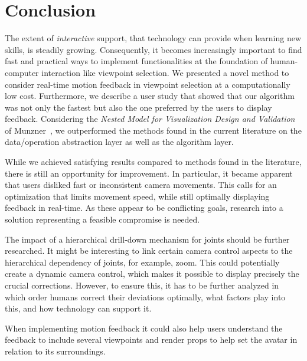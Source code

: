 \section{Conclusion}
The extent of \emph{interactive} support, that technology can provide when learning new skills, is steadily growing. Consequently, it becomes increasingly important to find fast and practical ways to implement functionalities at the foundation of human-computer interaction like viewpoint selection. We presented a novel method to consider real-time motion feedback in viewpoint selection at a computationally low cost. Furthermore, we describe a user study that showed that our algorithm was not only the fastest but also the one preferred by the users to display feedback. Considering the \emph{Nested Model for Visualization Design and Validation} of Munzner~\cite{munzner2009anm}, we outperformed the methods found in the current literature on the data/operation abstraction layer as well as the algorithm layer.

While we achieved satisfying results compared to methods found in the literature, there is still an opportunity for improvement. In particular, it became apparent that users disliked fast or inconsistent camera movements. This calls for an optimization that limits movement speed, while still optimally displaying feedback in real-time. As these appear to be conflicting goals, research into a solution representing a feasible compromise is needed.

The impact of a hierarchical drill-down mechanism for joints should be further researched. It might be interesting to link certain camera control aspects to the hierarchical dependency of joints, for example, zoom. This could potentially create a dynamic camera control, which makes it possible to display precisely the crucial corrections. However, to ensure this, it has to be further analyzed in which order humans correct their deviations optimally, what factors play into this, and how technology can support it.

When implementing motion feedback it could also help users understand the feedback to include several viewpoints and render props to help set the avatar in relation to its surroundings.

